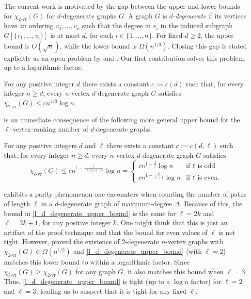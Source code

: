 \documentclass{patmorin}
\newcommand{\defin}[1]{\emph{\color{brightmaroon}#1}}
\newcommand{\rn}[1]{\chi_{\operatorname{#1-vr}}}
\newcommand{\trn}{\chi_{\mathrm{us}}}
\newcommand{\lrn}{\rn{\ell}}
\newcommand{\dexp}{1-\frac{1}{\lfloor\ell/2\rfloor+1/2}}
\begin{document}
The current work is motivated by the gap between the upper and lower bounds for $\rn{2}(G)$ for $d$-degenerate graphs $G$.  A graph $G$ is \defin{$d$-degenerate} if its vertices have an ordering $v_1,\ldots,v_n$ such that the degree in $v_i$ in the induced subgraph $G[\{v_1,\ldots,v_i\}]$ is at most $d$, for each $i\in\{1,\ldots,n\}$. For fixed $d\ge 2$, the upper bound is $O(\sqrt{n})$, while the lower bound is $\Omega(n^{1/3})$. Closing this gap is stated explicitly as an open problem by \citet{karpas.neiman.ea:on} and \citet{bose.dujmovic.ea:asymptotically}. Our first contribution solves
this problem, up to a logarithmic factor.

\begin{thm}\label{unique_superior}
  For any positive integer $d$ there exists a constant $c:=c(d)$ such that, for every integer $n\ge d$, every $n$-vertex $d$-degenerate graph $G$ satisfies $\rn{2}(G)\le cn^{1/3}\log n$.
\end{thm}

 is an immediate consequence of the following more general upper bound for the $\ell$-vertex-ranking number of $d$-degenerate graphs.

\begin{thm}\label{l_d_degenerate_upper_bound}
  For any positive integers $d$ and $\ell$ there exists a constant $c:=c(d,\ell)$ such that, for every integer $n\ge d$, every $n$-vertex $d$-degenerate graph $G$ satisfies
  \[
    \lrn(G)\le c n^{\dexp}\log n
    = \begin{cases}
      cn^{1-\frac{2}{\ell}}\log n & \text{if $\ell$ is odd} \\
      cn^{1-\frac{2}{\ell+1}}\log n & \text{if $\ell$ is even.}
      \end{cases}
  \]
\end{thm}
 exhibits a parity phenomenon one encounters when counting the number of paths of length $\ell$ in a $d$-degenerate graph of maximum-degree $\Delta$. Because of this, the bound in \cref{l_d_degenerate_upper_bound} is the same for $\ell=2k$ and $\ell=2k+1$, for any positive integer $k$.  One might think that this is just an artifact of the proof technique and that the bound for even values of $\ell$ is not tight.  However, \citet{karpas.neiman.ea:on} proved the existence of $2$-degenerate $n$-vertex graphs with $\rn{2}(G)\in\Omega(n^{1/3})$ and \cref{l_d_degenerate_upper_bound} (with $\ell=2$) matches this lower bound to within a logarithmic factor.  Since $\rn{3}(G)\ge\rn{2}(G)$ for any graph $G$, it also matches this bound when $\ell=3$.  Thus, \cref{l_d_degenerate_upper_bound} is tight (up to a $\log n$ factor) for $\ell=2$ and $\ell=3$, leading us to suspect that it is tight for any fixed $\ell$.
\end{document}
